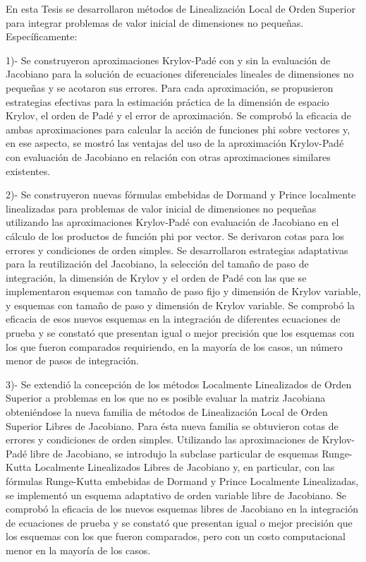 \begin{conclusions}

    En esta Tesis se desarrollaron métodos de Linealización Local de Orden Superior para integrar problemas de valor
    inicial de dimensiones no pequeñas. Específicamente:


    1)- Se construyeron aproximaciones Krylov-Padé con y sin la evaluación de Jacobiano para la solución de ecuaciones diferenciales lineales de dimensiones no pequeñas y se acotaron sus errores. Para cada aproximación, se propusieron estrategias efectivas para la estimación práctica de la dimensión de espacio Krylov, el orden de Padé y el error de aproximación. Se comprobó la eficacia de ambas aproximaciones para calcular la acción de funciones phi sobre vectores y, en ese aspecto, se mostró las ventajas del uso de la aproximación Krylov-Padé con evaluación de Jacobiano en relación con otras aproximaciones similares existentes.


    2)- Se construyeron nuevas fórmulas embebidas de Dormand y Prince localmente linealizadas para problemas de valor inicial de dimensiones no pequeñas utilizando las aproximaciones Krylov-Padé con evaluación de Jacobiano en el cálculo de los productos de función phi por vector. Se derivaron cotas para los errores y condiciones de orden simples. Se  desarrollaron estrategias adaptativas para la reutilización del Jacobiano, la selección del tamaño de paso de integración, la dimensión de Krylov y el orden de Padé con las que se implementaron esquemas con tamaño de paso fijo y dimensión de Krylov variable, y esquemas con tamaño de paso y dimensión de Krylov variable. Se comprobó la eficacia de esos nuevos esquemas en la integración de diferentes ecuaciones de prueba y se constató que presentan igual o mejor precisión que los esquemas con los que fueron comparados requiriendo, en la mayoría de los casos, un número menor de pasos de integración.


    3)- Se extendió la concepción de los métodos Localmente Linealizados de Orden Superior a problemas en los que no es posible evaluar la matriz Jacobiana obteniéndose la nueva familia de métodos de  Linealización Local de Orden Superior Libres de Jacobiano. Para ésta nueva familia se obtuvieron cotas de errores y condiciones de orden simples. Utilizando las aproximaciones de Krylov-Padé libre de Jacobiano, se introdujo la subclase particular de esquemas Runge-Kutta Localmente Linealizados Libres de Jacobiano y, en particular, con las fórmulas Runge-Kutta embebidas de Dormand y  Prince Localmente Linealizadas, se implementó un esquema adaptativo de orden variable libre de Jacobiano. Se comprobó la eficacia de los nuevos esquemas libres de Jacobiano en la integración de ecuaciones de prueba y se constató que presentan igual o mejor precisión que los esquemas con los que fueron comparados, pero con un costo computacional menor en la mayoría de los casos. 




\end{conclusions}
